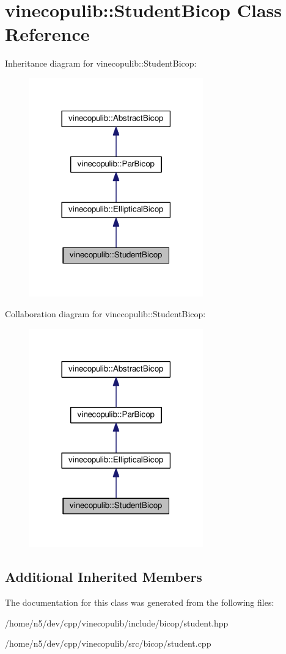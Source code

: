 \hypertarget{classvinecopulib_1_1_student_bicop}{}\section{vinecopulib\+:\+:Student\+Bicop Class Reference}
\label{classvinecopulib_1_1_student_bicop}


Inheritance diagram for vinecopulib\+:\+:Student\+Bicop\+:\nopagebreak
\begin{figure}[H]
\begin{center}
\leavevmode
\includegraphics[width=213pt]{classvinecopulib_1_1_student_bicop__inherit__graph}
\end{center}
\end{figure}


Collaboration diagram for vinecopulib\+:\+:Student\+Bicop\+:\nopagebreak
\begin{figure}[H]
\begin{center}
\leavevmode
\includegraphics[width=213pt]{classvinecopulib_1_1_student_bicop__coll__graph}
\end{center}
\end{figure}
\subsection*{Additional Inherited Members}


The documentation for this class was generated from the following files\+:\begin{DoxyCompactItemize}
\item 
/home/n5/dev/cpp/vinecopulib/include/bicop/student.\+hpp\item 
/home/n5/dev/cpp/vinecopulib/src/bicop/student.\+cpp\end{DoxyCompactItemize}
